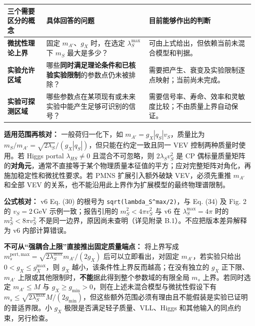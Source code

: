 \documentclass[
  chinese,
  UTF8]{ctexart}
\newcounter{none} %
\begin{document}
{\def\LTcaptype{none} %
\begin{longtable}[]{@{}
  >{\raggedright\arraybackslash}p{}
  >{\raggedright\arraybackslash}p{}
  >{\raggedright\arraybackslash}p{}@{}}
\toprule\noalign{}
\begin{minipage}[b]{\linewidth}\raggedright
三个需要区分的概念
\end{minipage} & \begin{minipage}[b]{\linewidth}\raggedright
具体回答的问题
\end{minipage} & \begin{minipage}[b]{\linewidth}\raggedright
目前能够作出的判断
\end{minipage} \\
\midrule\noalign{}
\endhead
\bottomrule\noalign{}
\endlastfoot
\textbf{微扰性理论上界} & 固定 \(m_{A'}\)、\(g_X\) 时，在选定
\(\lambda_S^{\max}\) 下 \(m_S\) 最大是多少？ &
可由上式给出，但依赖当前未混合模型和判据。 \\
\textbf{实验允许区域} &
哪些\textbf{同时满足理论条件和已核验实验限制}的参数点仍未被排除？ &
需要把产生、衰变及实验限制逐点映射；当前尚未完成。 \\
\textbf{实验可探测区域} &
哪些参数点在某项现有或未来实验中能产生足够可识别的信号？ &
需要信号率、寿命、效率和灵敏度比较；不由质量上界自动保证。 \\
\end{longtable}
}

\textbf{适用范围再核对：} 一般荷归一化下，如
\(m_{A'}=g_X|q_S|v_S\)，质量比为
\(m_S/m_{A'}=\sqrt{2\lambda_S}/(g_X|q_S|)\)，但只能在约定一致且同一 VEV
控制两种质量时使用。若 Higgs portal \(\lambda_{HS}\ne0\)
且混合不可忽略，则 \(2\lambda_Sv_S^2\) 是 CP
偶标量质量矩阵的\textbf{对角元}，通常不直接等于某个物理质量本征值的平方；应对完整矩阵对角化，再施加稳定性和微扰性要求。若
PMNS 扩展引入额外破缺 VEV，必须先重推 \(m_{A'}\) 和全部 VEV
的关系，也不能沿用此上界作为扩展模型的最终物理谱限制。

\textbf{公式核对：} v6 Eq. (30) 的根号为
\texttt{sqrt(lambda\_S\^{}max/2)}，与 Eq. (34) 及 Fig. 2 的
\(v_S=2\,\mathrm{GeV}\) 示例一致；报告引用的 \(m_S^2<4\pi v_S^2\) 与 v6
在 \(\lambda_S^{\max}=4\pi\) 时的 \(m_S^2<8\pi v_S^2\)
不是同一边界，原因尚未查明（详见附录 B.1）。不应把版本差异解释为 v6
内部计算错误。

\textbf{不可从``强耦合上限''直接推出固定质量端点：} 将上界写成
\(m_s^{\mathrm{pert,max}}=\sqrt{2\lambda_S^{\max}}m_{A'}/(2g_X)\)
后可以立即看出，对固定 \(m_{A'}\)，若实验只给出
\(0<g_X\leq g_X^{\max}\)，则 \(g_X\)
越小，该条件性上界反而越高；在没有独立的 \(g_X\) 正下限、\(m_{A'}\)
上限或其他限制时，\textbf{不能}据此得到整个参数域的有限全局 \(m_s\)
上界。若同时选定 \(m_{A'}\leq M\) 与
\(g_X\geq g_{\min}>0\)，则在上述未混合模型与微扰性假设下有
\(m_s\leq\sqrt{2\lambda_S^{\max}}M/(2g_{\min})\)，但这些额外范围必须有理由且不能假装是实验已证明的普适界限。小
\(g_X\) 极限是否满足轻子质量、VLL、Higgs
和其他输入的同点约束，另行检查。
\end{document}
